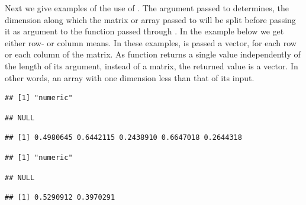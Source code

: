 \documentclass[krantz2,ChapterTOCs]{krantz}\usepackage{knitr}
\begin{document}
Next we give examples of the use of . The argument passed to  determines, the dimension along which the matrix or array passed to  will be split before passing it as argument to the function passed through . In the example below we get either row- or column means. In these examples,  is passed a vector, for each row or each column of the matrix. As function  returns a single value independently of the length of its argument, instead of a matrix, the returned value is a vector. In other words, an array with one dimension less than that of its input.

\begin{knitrout}\footnotesize
{}\color{fgcolor}\begin{kframe}
\begin{alltt}
\hlstd{(}\hlstd{)}
 \hlkwb{<-} \hlstd{(}\hlstd{(}\hlstd{),}  \hlstd{=} \hlstd{)}
 \hlkwb{<-} \hlstd{(}   \hlstd{=} \hlstd{,}    \hlstd{=} \hlstd{)}
\end{alltt}
\begin{verbatim}
## [1] "numeric"
\end{verbatim}
\begin{alltt}
\end{alltt}
\begin{verbatim}
## NULL
\end{verbatim}
\begin{alltt}
\end{alltt}
\begin{verbatim}
## [1] 0.4980645 0.6442115 0.2438910 0.6647018 0.2644318
\end{verbatim}
\begin{alltt}
 \hlkwb{<-} \hlstd{(}   \hlstd{=} \hlstd{,}    \hlstd{=} \hlstd{)}
\end{alltt}
\begin{verbatim}
## [1] "numeric"
\end{verbatim}
\begin{alltt}
\end{alltt}
\begin{verbatim}
## NULL
\end{verbatim}
\begin{alltt}
\end{alltt}
\begin{verbatim}
## [1] 0.5290912 0.3970291
\end{verbatim}
\end{kframe}
\end{knitrout}
\end{document}
